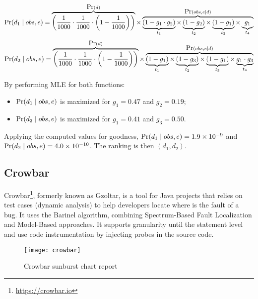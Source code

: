 \begin{description}
\begin{equation}
    \mbox{Pr}(d_1 \mid obs,e) =
    \overbrace{\bigg(\frac{1}{1000} \cdot \frac{1}{1000} \cdot \bigg(1 - \frac{1}{1000}\bigg)\bigg)}^{\mbox{Pr}(d)}
    \times
    \overbrace{
      \underbrace{(1-g_1 \cdot g_2)}_{t_1}
      \times
      \underbrace{(1-g_2)}_{t_2}
      \times
      \underbrace{(1-g_1)}_{t_3}
      \times
      \underbrace{g_1}_{t_4}
    }^{\mbox{Pr}(obs,e \mid d)}
\end{equation}
%
\begin{equation}
    \mbox{Pr}(d_2 \mid obs,e) =
    \overbrace{\bigg(\frac{1}{1000} \cdot \frac{1}{1000} \cdot \bigg(1 - \frac{1}{1000}\bigg)\bigg)}^{\mbox{Pr}(d)}
    \times
    \overbrace{
      \underbrace{(1-g_1)}_{t_1}
      \times
      \underbrace{(1-g_3)}_{t_2}
      \times
      \underbrace{(1-g_1)}_{t_3}
      \times
      \underbrace{g_1 \cdot g_3}_{t_4}
    }^{\mbox{Pr}(obs,e \mid d)}
\end{equation}
\end{description}

By performing MLE for both functions:
\begin{itemize}
\item $\mbox{Pr}(d_1 \mid obs,e)$ is maximized for $g_1=0.47$ and $g_2=0.19$;
\item $\mbox{Pr}(d_2 \mid obs,e)$ is maximized for $g_1=0.41$ and $g_3=0.50$.
\end{itemize}

Applying the computed values for goodness, $\mbox{Pr}(d_1 \mid obs,e)=1.9 \times 10^{-9}$ and $\mbox{Pr}(d_2 \mid obs,e)=4.0 \times 10^{-10}$. The ranking is then $(d_1,d_2)$.


\subsection{Crowbar}
Crowbar\footnote{\url{https://crowbar.io}}, formerly known as Gzoltar, is a tool for Java projects that relies on test cases (dynamic analysis) to help developers locate where is the fault of a bug. It uses the Barinel algorithm, combining Spectrum-Based Fault Localization and Model-Based approaches. It supports granularity until the statement level and use code instrumentation by injecting probes in the source code.

\begin{figure}[H]
    \begin{center}
        \texttt{[image: crowbar]}
        \caption{Crowbar sunburst chart report}
        \label{figure:crowbar_report}
    \end{center}
\end{figure}

